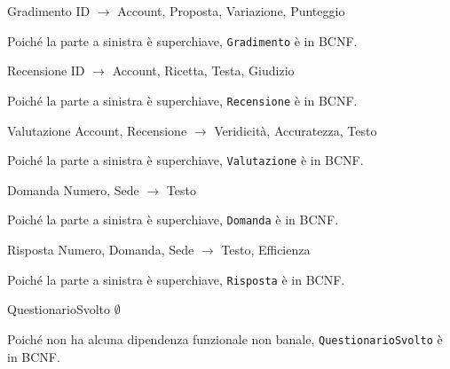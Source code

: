 \begin{samepage}
\begin{funcdep}{Gradimento}
    ID $\to$ Account, Proposta, Variazione, Punteggio
\end{funcdep}
Poiché la parte a sinistra è superchiave, {\tt Gradimento} è in BCNF.
\end{samepage}

\begin{samepage}
\begin{funcdep}{Recensione}
    ID $\to$ Account, Ricetta, Testa, Giudizio
\end{funcdep}
Poiché la parte a sinistra è superchiave, {\tt Recensione} è in BCNF.
\end{samepage}

\begin{samepage}
\begin{funcdep}{Valutazione}
    Account, Recensione $\to$ Veridicità, Accuratezza, Testo
\end{funcdep}
Poiché la parte a sinistra è superchiave, {\tt Valutazione} è in BCNF.
\end{samepage}

\begin{samepage}
\begin{funcdep}{Domanda}
    Numero, Sede $\to$ Testo
\end{funcdep}
Poiché la parte a sinistra è superchiave, {\tt Domanda} è in BCNF.
\end{samepage}

\begin{samepage}
\begin{funcdep}{Risposta}
    Numero, Domanda, Sede $\to$ Testo, Efficienza
\end{funcdep}
Poiché la parte a sinistra è superchiave, {\tt Risposta} è in BCNF.
\end{samepage}

\begin{samepage}
\begin{funcdep}{QuestionarioSvolto}
    $\emptyset$
\end{funcdep}
Poiché non ha alcuna dipendenza funzionale non banale, {\tt QuestionarioSvolto} è in BCNF.
\end{samepage}
